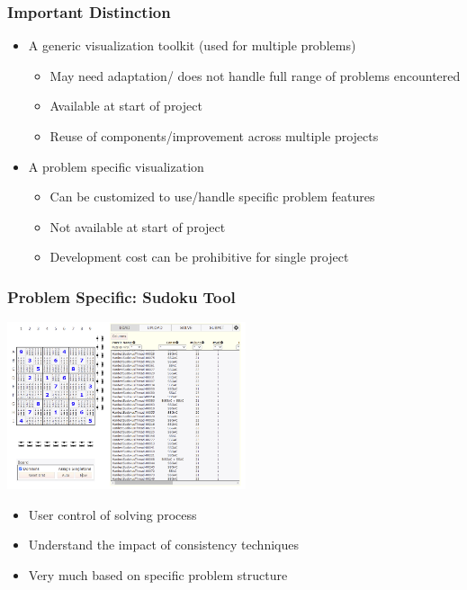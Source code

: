 \documentclass[dvipsnames,aspectratio=169]{beamer}
\begin{document}
\begin{frame}
\frametitle{Important Distinction}
\begin{itemize}
\item A generic visualization toolkit (used for multiple problems)
\begin{itemize}
\item May need adaptation/ does not handle full range of problems encountered
\item Available at start of project
\item Reuse of components/improvement across multiple projects
\end{itemize}
\item A problem specific visualization
\begin{itemize}
\item Can be customized to use/handle specific problem features
\item Not available at start of project
\item Development cost can be prohibitive for single project
\end{itemize}

\end{itemize}
\end{frame}

\begin{frame}
\frametitle{Problem Specific: Sudoku Tool \cite{DBLP:conf/ijcai/HowellWCB18}}
\includegraphics[width=7cm]{images/sudokuweb}
\begin{itemize}
\item User control of solving process
\item Understand the impact of consistency techniques
\item Very much based on specific problem structure
\end{itemize}
\end{frame}
\end{document}
